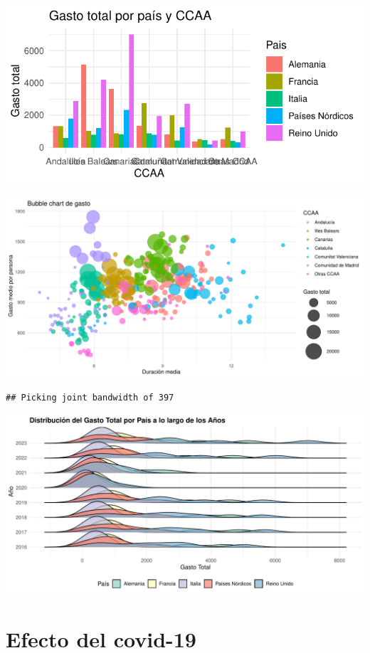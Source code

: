 \documentclass[data,article,submit,moreauthors,pdftex]{Definitions/mdpi}
\begin{document}
\includegraphics{ProyectoAED2024_Rmd_files/figure-latex/unnamed-chunk-23-1}

\includegraphics{ProyectoAED2024_Rmd_files/figure-latex/unnamed-chunk-24-1}

\begin{verbatim}
## Picking joint bandwidth of 397
\end{verbatim}

\includegraphics{ProyectoAED2024_Rmd_files/figure-latex/unnamed-chunk-25-1}

\section{Efecto del covid-19}\label{efecto-del-covid-19}
\end{document}
